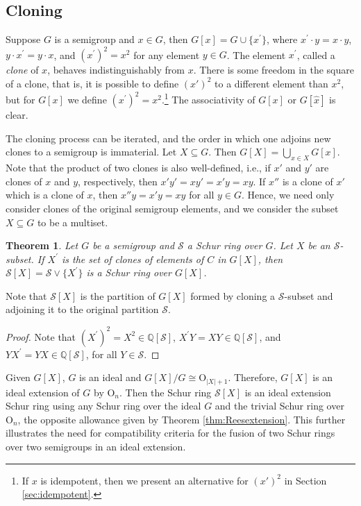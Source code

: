 \documentclass{article}
\theoremstyle{plain}
\newtheorem{Thm}{Theorem}[section]
\theoremstyle{definition}
\newcommand{\thmref}[1]{Theorem \ref{#1}}
\renewcommand{\S}{\mathcal{S}}
\newcommand{\Q}{\mathbb{Q}}
\newcommand{\QS}{\Q[\S]}
\renewcommand{\O}{\mathrm{O}}
\begin{document}
\subsection{Cloning}\label{sec:clone}
Suppose $G$ is a semigroup and $x\in G$, then \label{clone}$G[x] = G\cup \{x^\prime\}$, where $x^\prime\cdot y=x\cdot y$,  $y\cdot x^\prime =y\cdot x$, and $\left(x^\prime\right)^2=x^2$ for any element $y\in G$. The element $x^\prime$, called a \textit{clone} of $x$, behaves indistinguishably from $x$. There is some freedom in the square of a clone, that is, it is possible to define $(x')^2$ to a different element than $x^2$, but for $G[x]$ we define $(x^\prime)^2=x^2$.\footnote{If $x$ is idempotent, then we present an alternative for $(x')^2$ in Section \ref{sec:idempotent}.}  The associativity of $G[x]$ or $G[\hat{x}]$ is clear.

The cloning process can be iterated, and the order in which one adjoins new clones to a semigroup is immaterial. Let $X\subseteq G$. Then $G[X] = \bigcup_{x\in X} G[x]$. Note that the product of two clones is also well-defined, i.e., if $x'$ and $y'$ are clones of $x$ and $y$, respectively, then $x'y' = xy' = x'y = xy$. If $x''$ is a clone of $x'$ which is a clone of $x$, then $x''y = x'y = xy$ for all $y\in G$. Hence, we need only consider clones of the original semigroup elements, and we consider the subset $X\subseteq G$ to be a multiset. 

\begin{Thm}\label{thm:clonerings}
Let $G$ be a semigroup and $\S$ a Schur ring over $G$. Let $X$ be an $\S$-subset. If $X^\prime$ is the set of clones of elements of $C$ in $G[X]$, then $\S[X] = \S\vee \{X^\prime\}$ is a Schur ring over $G[X]$.
\end{Thm}
Note that $\S[X]$ is the partition of $G[X]$ formed by cloning a $\S$-subset and adjoining it to the original partition $\S$.
\begin{proof}
Note that $\left(X^\prime\right)^2 = X^2\in \QS$,  $X^\prime Y = XY\in \QS$, and $YX^\prime = YX \in \QS$, for all $Y\in \S$. 
\end{proof}

Given $G[X]$, $G$ is an ideal and $G[X]/G \cong \O_{|X|+1}$. Therefore, $G[X]$ is an ideal extension of $G$ by $\O_n$. Then the Schur ring $\S[X]$ is an ideal extension Schur ring using any Schur ring over the ideal $G$ and the trivial Schur ring over $\O_n$, the opposite allowance given by \thmref{thm:Reesextension}. This further illustrates the need for compatibility criteria for the fusion of two Schur rings over two semigroups in an ideal extension.
\end{document}
